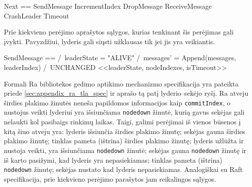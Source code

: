 \documentclass{VUMIFPSkursinis}
\begin{document}
\begin{adjustwidth}{2cm}{}

\begin{tla}
Next == \/ SendMessage
        \/ IncrementIndex
        \/ DropMessage
        \/ ReceiveMessage
        \/ CrashLeader
        \/ Timeout
\end{tla}
\begin{tlatex}
\@pvspace{8.0pt}%
%
%
%
%
%
%
\@pvspace{8.0pt}%
\end{tlatex}

\end{adjustwidth}


Prie kiekvieno perėjimo aprašytos sąlygos, kurias tenkinant šis perėjimas gali įvykti. Pavyzdžiui, lyderis gali siųsti užklausas tik jei jis yra veikiantis.


\begin{adjustwidth}{2cm}{}

\begin{tla}
SendMessage == 
        /\ leaderState = "ALIVE"
        /\ messages' = Append(messages, leaderIndex)
        /\ UNCHANGED <<leaderState, nodeIndexes, isTimeout>>
\end{tla}
\begin{tlatex}
\@pvspace{8.0pt}%
%
%
\@pvspace{8.0pt}%
\end{tlatex}

\end{adjustwidth}


Formali Ra bibliotekos gedimo aptikimo mechanizmo specifikacija yra pateikta priede \ref{sec:appendix_ra_tla_spec} ir aprašo tą patį lyderio--sekėjo ryšį. Ra atveju širdies plakimo žinutės neneša papildomos informacijos kaip \texttt{commitIndex}, o nustojus veikti lyderiui yra išsiunčiama \texttt{nodedown} žinutė, kurią gavus sekėjas gali nelaukti kol pasibaigs rinkimų laikas. Taigi, galimi perėjimai iš vienos būsenos į kitą šiuo atveju yra: lyderis išsiunčia širdies plakimo žinutę; sekėjas gauna širdies plakimo žinutę; tinklas pameta (ištrina) širdies plakimo žinutę; lyderis užlūžta ir nustoja veikti, yra išsiunčiama \texttt{nodedown} žinutė; sekėjas gauna \texttt{nodedown} žinutę ir iš karto pasižymi, kad lyderis yra nepasiekiamas; tinklas pameta (ištrina) \texttt{nodedown} žinutę; sekėjas nustato kad lyderis nepasiekiamas. Analogiškai su Raft specifikacija, prie kiekvieno perėjimo parašytos jam reikalingos sąlygos.
\end{document}
